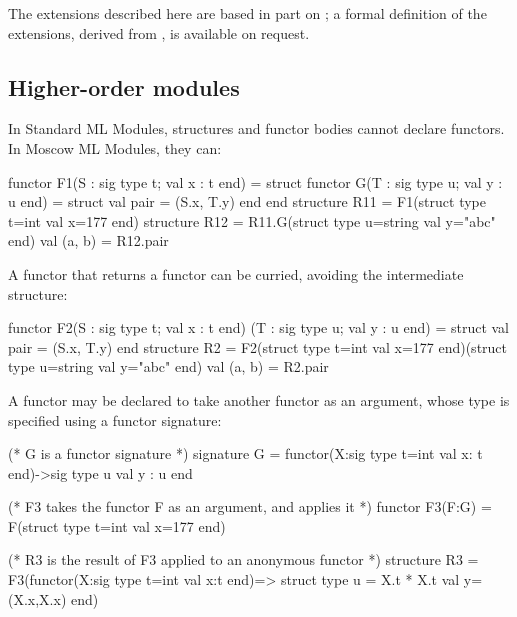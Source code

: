\documentclass[fleqn,a4paper]{article}
\begin{document}
The extensions described here are based in part on
\cite{Russo:TypesForModules,Russo:FirstClassStructures}; a formal
definition of the extensions, derived from
\cite{Milner:1990:TheDefinition, Milner:1997:TheDefinition}, is
available on request.



\subsection{Higher-order modules}

\label{sec-ho-modules}

In Standard ML Modules, structures and functor bodies cannot declare
functors.  In Moscow ML Modules, they can:

\begin{program}
functor F1(S : sig type t; val x : t end) = struct
    functor G(T : sig type u; val y : u end) = struct val pair = (S.x, T.y) end
end
structure R11 = F1(struct type t=int val x=177 end)
structure R12 = R11.G(struct type u=string val y="abc" end)
val (a, b) = R12.pair
\end{program}

\noindent 
A functor that returns a functor can be curried, avoiding the intermediate
structure:

\begin{program}
functor F2(S : sig type t; val x : t end) (T : sig type u; val y : u end) = 
   struct val pair = (S.x, T.y) end
structure R2 = 
   F2(struct type t=int val x=177 end)(struct type u=string val y="abc" end)
val (a, b) = R2.pair
\end{program}

\noindent 


\noindent 
A functor may be declared to take another functor as an argument, whose
type is specified using a functor signature:

\begin{program}
(* G is a functor signature *)
signature G = functor(X:sig type t=int val x: t end)->sig type u val y : u end

(* F3 takes the functor F as an argument, and applies it *)
functor F3(F:G) = F(struct type t=int val x=177 end) 

(* R3 is the result of F3 applied to an anonymous functor *)        
structure R3 = F3(functor(X:sig type t=int val x:t end)=> 
                  struct type u = X.t * X.t val y= (X.x,X.x) end)
\end{program}
\end{document}
